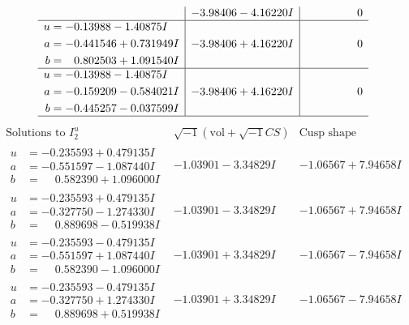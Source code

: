 \documentclass[1p]{elsarticle_modified}
\theoremstyle{definition}
\newcommand{\I}{\sqrt{-1}}
\begin{document}
$$\begin{array}{c|c|c}
 & -3.98406 - 4.16220 I & \phantom{-0.000000 } 0 \\ \hline\begin{aligned}
u &= -0.13988 - 1.40875 I \\
a &= -0.441546 + 0.731949 I \\
b &= \phantom{-}0.802503 + 1.091540 I\end{aligned}
 & -3.98406 + 4.16220 I & \phantom{-0.000000 } 0 \\ \hline\begin{aligned}
u &= -0.13988 - 1.40875 I \\
a &= -0.159209 - 0.584021 I \\
b &= -0.445257 - 0.037599 I\end{aligned}
 & -3.98406 + 4.16220 I & \phantom{-0.000000 } 0\\
 \hline 
 \end{array}$$\newpage$$\begin{array}{c|c|c}  
\text{Solutions to }I^u_{2}& \I (\text{vol} + \sqrt{-1}CS) & \text{Cusp shape}\\
 \hline 
\begin{aligned}
u &= -0.235593 + 0.479135 I \\
a &= -0.551597 - 1.087440 I \\
b &= \phantom{-}0.582390 + 1.096000 I\end{aligned}
 & -1.03901 - 3.34829 I & -1.06567 + 7.94658 I \\ \hline\begin{aligned}
u &= -0.235593 + 0.479135 I \\
a &= -0.327750 - 1.274330 I \\
b &= \phantom{-}0.889698 - 0.519938 I\end{aligned}
 & -1.03901 - 3.34829 I & -1.06567 + 7.94658 I \\ \hline\begin{aligned}
u &= -0.235593 - 0.479135 I \\
a &= -0.551597 + 1.087440 I \\
b &= \phantom{-}0.582390 - 1.096000 I\end{aligned}
 & -1.03901 + 3.34829 I & -1.06567 - 7.94658 I \\ \hline\begin{aligned}
u &= -0.235593 - 0.479135 I \\
a &= -0.327750 + 1.274330 I \\
b &= \phantom{-}0.889698 + 0.519938 I\end{aligned}
 & -1.03901 + 3.34829 I & -1.06567 - 7.94658 I \\ \hline\begin{aligned}

\end{aligned}
\end{array}$$
\end{document}
